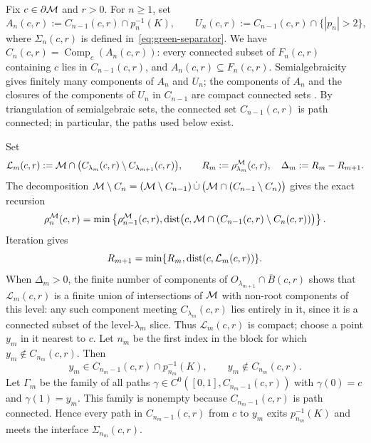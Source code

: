 Fix \(c\in\partial\mathcal M\) and \(r>0\). For \(n\ge1\), set
\begin{equation}
 \label{eq:one-step-slice}
 A_n(c,r):=C_{n-1}(c,r)\cap p_n^{-1}(K),\qquad
 U_n(c,r):=C_{n-1}(c,r)\cap\{|p_n|>2\},
\end{equation}
where \(\Sigma_n(c,r)\) is defined in~\eqref{eq:green-separator}. We
have \(C_n(c,r)=\operatorname{Comp}_c(A_n(c,r))\): every connected
subset of \(F_n(c,r)\) containing \(c\) lies in \(C_{n-1}(c,r)\), and
\(A_n(c,r)\subseteq F_n(c,r)\). Semialgebraicity gives finitely many
components of \(A_n\) and \(U_n\); the components of \(A_n\) and the
closures of the components of \(U_n\) in \(C_{n-1}\) are compact
connected sets \cite[Theorem~2.4.5]{BCR}. By triangulation of
semialgebraic sets, the connected set \(C_{n-1}(c,r)\) is path
connected; in particular, the paths used below exist.

Set
\begin{equation}
 \label{eq:block-newly-separated-set}
 \mathcal L_m(c,r):=\mathcal M\cap
 \bigl(C_{\lambda_m}(c,r)\setminus C_{\lambda_{m+1}}(c,r)\bigr),
 \qquad R_m:=\rho_{\lambda_m}^{\mathcal M}(c,r),\quad
 \Delta_m:=R_m-R_{m+1}.
\end{equation}
The decomposition
\(\mathcal M\setminus C_n=(\mathcal M\setminus C_{n-1})\,\dot\cup\,
\bigl(\mathcal M\cap(C_{n-1}\setminus C_n)\bigr)\)
gives the exact recursion
\begin{equation}
 \label{eq:one-step-radius-recursion}
 \rho_n^{\mathcal M}(c,r)=
 \min\left\{\rho_{n-1}^{\mathcal M}(c,r),
 \operatorname{dist}\bigl(c,\mathcal M\cap(C_{n-1}(c,r)\setminus C_n(c,r))\bigr)\right\}.
\end{equation}
Iteration gives
\begin{equation}
 \label{eq:block-radius-loss-exact}
 R_{m+1}=\min\{R_m,\operatorname{dist}(c,\mathcal L_m(c,r))\}.
\end{equation}
When \(\Delta_m>0\), the finite number of components of
\(O_{\lambda_{m+1}}\cap\overline B(c,r)\) shows that
\(\mathcal L_m(c,r)\) is a finite union of intersections of \(\mathcal M\) with
non-root components of this level: any such component meeting
\(C_{\lambda_m}(c,r)\) lies entirely in it, since it is a connected
subset of the level-\(\lambda_m\) slice. Thus \(\mathcal L_m(c,r)\) is
compact; choose a point \(y_m\) in it nearest to \(c\). Let \(n_m\) be
the first index in the block for which \(y_m\notin C_{n_m}(c,r)\). Then
\[
 y_m\in C_{n_m-1}(c,r)\cap p_{n_m}^{-1}(K),\qquad
 y_m\notin C_{n_m}(c,r).
\]
Let \(\Gamma_m\) be the family of all paths
\(\gamma\in C^0([0,1],C_{n_m-1}(c,r))\) with
\(\gamma(0)=c\) and \(\gamma(1)=y_m\). This family is nonempty because
\(C_{n_m-1}(c,r)\) is path connected. Hence every path in
\(C_{n_m-1}(c,r)\) from \(c\) to \(y_m\) exits \(p_{n_m}^{-1}(K)\) and
meets the interface \(\Sigma_{n_m}(c,r)\).

